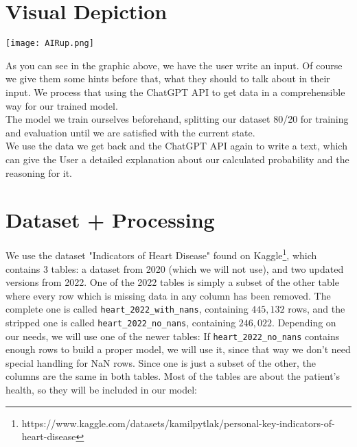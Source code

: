 \documentclass{article}
\begin{document}
\section{Visual Depiction}
\begin{center} 
\texttt{[image: AIRup.png]}
\end{center}
As you can see in the graphic above, we have the user write an input. Of course we give them some hints before that, what they should to talk about in their input. We process that using the ChatGPT API to get data in a comprehensible way for our trained model.
\\
The model we train ourselves beforehand, splitting our dataset 80/20 for training and evaluation until we are satisfied with the current state.
\\
We use the data we get back and the ChatGPT API again to write a text, which can give the User a detailed explanation about our calculated probability and the reasoning for it.

\newpage

\section{Dataset + Processing}


We use the dataset "Indicators of Heart Disease" found on Kaggle\footnote{https://www.kaggle.com/datasets/kamilpytlak/personal-key-indicators-of-heart-disease},
which contains 3 tables: a dataset from 2020 (which we will not use),
and two updated versions from 2022.
One of the 2022 tables is simply a subset of the other table where every row which is missing data in any column has been removed.
The complete one is called \texttt{heart\_2022\_with\_nans}, containing $445,132$ rows,
and the stripped one is called \texttt{heart\_2022\_no\_nans}, containing $246,022$.
Depending on our needs, we will use one of the newer tables:
If \texttt{heart\_2022\_no\_nans} contains enough rows to build a proper model,
we will use it, since that way we don't need special handling for NaN rows.
Since one is just a subset of the other, the columns are the same in both tables.
Most of the tables are about the patient's health, so they will be included in our model:
\end{document}
